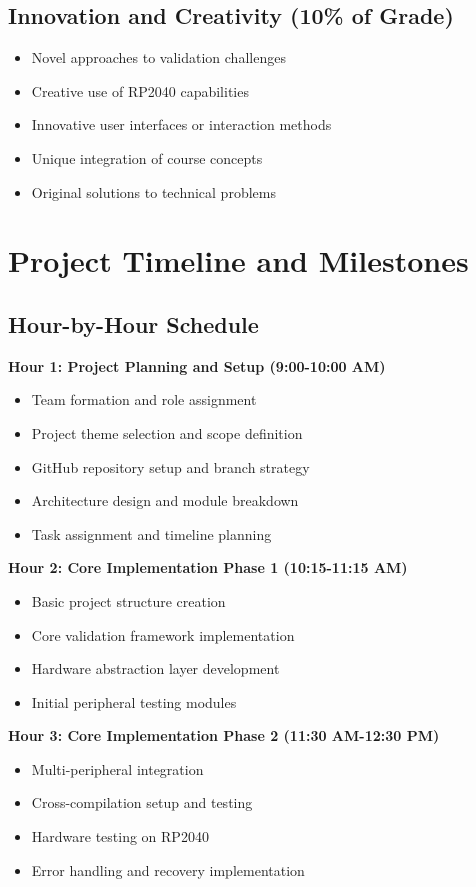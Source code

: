 \documentclass[11pt,a4paper]{article}
\begin{document}
\subsection{Innovation and Creativity (10\% of Grade)}
\begin{itemize}
    \item Novel approaches to validation challenges
    \item Creative use of RP2040 capabilities
    \item Innovative user interfaces or interaction methods
    \item Unique integration of course concepts
    \item Original solutions to technical problems
\end{itemize}

\section{Project Timeline and Milestones}

\subsection{Hour-by-Hour Schedule}

\textbf{Hour 1: Project Planning and Setup (9:00-10:00 AM)}
\begin{itemize}
    \item Team formation and role assignment
    \item Project theme selection and scope definition
    \item GitHub repository setup and branch strategy
    \item Architecture design and module breakdown
    \item Task assignment and timeline planning
\end{itemize}

\textbf{Hour 2: Core Implementation Phase 1 (10:15-11:15 AM)}
\begin{itemize}
    \item Basic project structure creation
    \item Core validation framework implementation
    \item Hardware abstraction layer development
    \item Initial peripheral testing modules
\end{itemize}

\textbf{Hour 3: Core Implementation Phase 2 (11:30 AM-12:30 PM)}
\begin{itemize}
    \item Multi-peripheral integration
    \item Cross-compilation setup and testing
    \item Hardware testing on RP2040
    \item Error handling and recovery implementation
\end{itemize}
\end{document}
